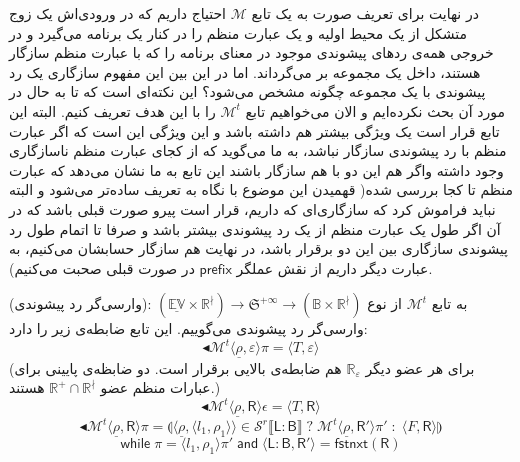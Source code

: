 در نهایت برای تعریف صورت به یک تابع $\mathcal{M}$ احتیاج داریم که در ورودی‌اش یک زوج متشکل از یک محیط اولیه و یک عبارت منظم را در کنار یک برنامه می‌گیرد و در خروجی همه‌ی ردهای پیشوندی موجود در معنای برنامه را که با عبارت منظم سازگار هستند، داخل یک مجموعه بر می‌گرداند.
اما در این بین این مفهوم سازگاری یک رد پیشوندی با یک مجموعه چگونه مشخص می‌شود؟ این نکته‌ای است که تا به حال در مورد آن بحث نکرده‌ایم و الان می‌خواهیم تابع $\mathcal{M}^t$ را با این هدف تعریف کنیم. البته این تابع قرار است یک ویژگی بیشتر هم داشته باشد و این ویژگی این است که اگر عبارت منظم با رد پیشوندی سازگار نباشد، به ما می‌گوید که از کجای عبارت منظم ناسازگاری وجود داشته واگر هم این دو با هم سازگار باشند این تابع به ما نشان می‌دهد که عبارت منظم تا کجا بررسی شده( قهمیدن این موضوع با نگاه به تعریف ساده‌تر می‌شود و البته نباید فراموش کرد که سازگاری‌ای که داریم، قرار است پیرو صورت قبلی باشد که در آن اگر طول یک عبارت منظم از یک رد پیشوندی بیشتر باشد و صرفا تا اتمام طول رد پیشوندی سازگاری بین این دو برقرار باشد، در نهایت هم سازگار حسابشان می‌کنیم، به عبارت دیگر داریم از نقش عملگر $\mathsf{prefix}$ در صورت قبلی صحبت می‌کنیم).
\begin{defn}
	(وارسی‌گر رد پیشوندی): به تابع $\mathcal{M}^t$ از نوع 
	$\mathbb{(\underline{EV} \times R^\nmid) \rightarrow  \mathfrak{S}^{+\infty}}
	\rightarrow (\mathbb{B \times R^\nmid} ) $
	وارسی‌گر رد پیشوندی می‌گوییم. این تابع ضابطه‌ی زیر را دارد:
	$$\blacktriangleleft\mathcal{M}^t \langle \underline{\rho} , \varepsilon \rangle \pi = 
	\langle \mathit{T} , \varepsilon \rangle$$
	(برای هر عضو دیگر $\mathbb{R_\varepsilon}$ هم ضابطه‌ی بالایی برقرار است. دو ضابظه‌ی پایینی برای عبارات منظم عضو $\mathbb{R^+ \cap R^\nmid}$ هستند.)
	$$\blacktriangleleft\mathcal{M}^t \langle \underline{\rho} , \mathsf{R} \rangle \epsilon = 
	\langle \mathit{T} , \mathsf{R} \rangle$$
	$$\blacktriangleleft\mathcal{M}^t \langle \underline{\rho} , \mathsf{R} \rangle \pi = 
	\llparenthesis \langle \underline{\rho}, \langle l_1, \rho_1 \rangle \rangle \in
	\mathcal{S}^r \llbracket \mathsf{L:B} \rrbracket \; ? \; 
	\mathcal{M}^t \langle \underline{\rho}, \mathsf{R'} \rangle \pi' \; : \; 
	\langle \mathit{F}, \mathsf{R} \rangle \rrparenthesis$$
	$$\mathsf{while}\; \pi=\langle l_1,\rho_1\rangle \pi' \;\mathsf{and}\; 
	\langle \mathsf{L:B,R'}\rangle = \mathsf{fstnxt(R)}$$
	
\end{defn}

